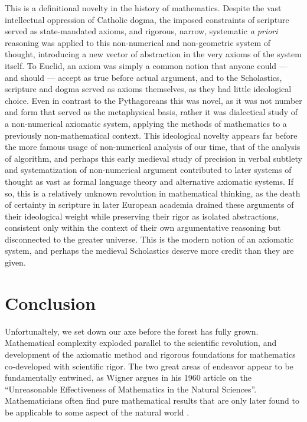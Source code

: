 \documentclass[12pt]{article}
\begin{document}
This is a definitional novelty in the history of mathematics.
Despite the vast intellectual oppression of Catholic dogma,
the imposed constraints of scripture served as state-mandated axioms,
and rigorous, narrow, systematic \textit{a priori} reasoning
was applied to this non-numerical and non-geometric
system of thought,
introducing a new vector of abstraction
in the very axioms of the system itself.
To Euclid, an axiom was simply a common notion
that anyone could ---
and should ---
accept as true before actual argument,
and to the Scholastics, scripture and dogma served
as axioms themselves, as they had little ideological choice.
Even in contrast to the Pythagoreans this was novel,
as it was not number and form that served as the metaphysical basis,
rather it was dialectical study of a non-numerical axiomatic system,
applying the methods of mathematics to a previously non-mathematical context.
This ideological novelty appears far before the more famous usage
of non-numerical analysis of our time,
that of the analysis of algorithm,
and perhaps this early medieval study of precision in verbal subtlety
and systematization of non-numerical argument
contributed to later systems of thought as vast as formal language theory
and alternative axiomatic systems.
If so, this is a relatively unknown revolution in mathematical thinking,
as the death of certainty in scripture in later European academia
drained these arguments of their ideological weight
while preserving their rigor as isolated abstractions,
consistent only within the context of their own argumentative reasoning
but disconnected to the greater universe.
This is the modern notion of an axiomatic system,
and perhaps the medieval Scholastics deserve more credit than they are given.

\section{Conclusion}

Unfortunaltely, we set down our axe
before the forest has fully grown.
Mathematical complexity exploded
parallel to the scientific revolution,
and development of the axiomatic method
and rigorous foundations for mathematics
co-developed with scientific rigor.
The two great areas of endeavor
appear to be fundamentally entwined,
as Wigner argues in his 1960 article
on the ``Unreasonable Effectiveness
of Mathematics in the Natural Sciences''.
Mathematicians often find pure mathematical results
that are only later found to be applicable
to some aspect of the natural world \cite{wigner}.
\end{document}

